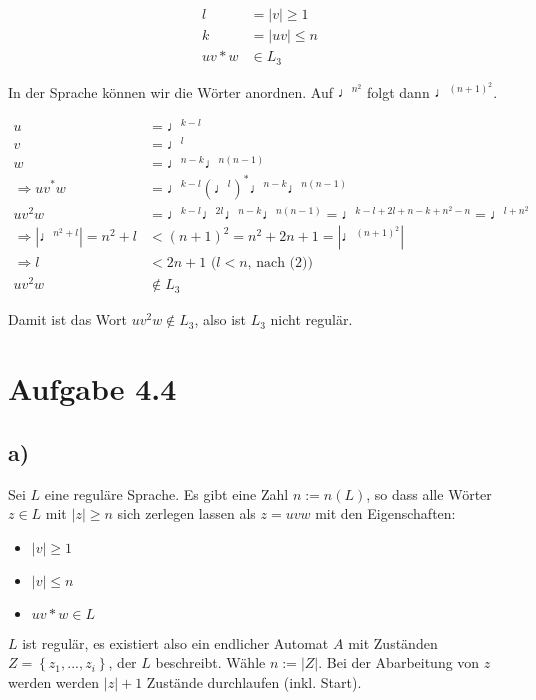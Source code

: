 \documentclass{article}
\begin{document}
\setcounter{equation}{0}
\begin{align}
l &= |v|  \geq 1 \\
k &= |uv| \leq n \\
uv*w &\in L_3
\end{align}

In der Sprache können wir die Wörter anordnen. Auf $\quarternote^{n^2}$ folgt dann $\quarternote^{(n+1)^2}$. 

\begin{align*}
u &= \quarternote^{k-l} \\
v &= \quarternote^{l} \\
w &= \quarternote^{n-k}\quarternote^{n(n-1)} \\
\Rightarrow uv^*w &= \quarternote^{k-l}\left(\quarternote^l\right)^*\quarternote^{n-k}\quarternote^{n(n-1)} \\
uv^2w &= \quarternote^{k-l}\quarternote^{2l}\quarternote^{n-k}\quarternote^{n(n-1)} = \quarternote^{k-l+2l+n-k+n^2-n} = \quarternote^{l+n^2} \\
\Rightarrow |\quarternote^{n^2+l}| = n^2+l &< (n+1)^2 = n^2+2n+1= |\quarternote^{(n+1)^2}| \\
\Rightarrow l &< 2n+1 \mbox{ ($l < n$, nach (2))} \\
uv^2w &\notin L_3
\end{align*}

Damit ist das Wort $uv^2w \notin L_3$, also ist $L_3$ nicht regulär.


\section*{Aufgabe 4.4}
\subsection*{a)}
Sei $L$ eine reguläre Sprache. Es gibt eine Zahl $n := n(L)$, so dass alle Wörter $z \in L$ mit $|z| \geq n$ sich zerlegen lassen als $z = uvw$ mit den Eigenschaften:
\begin{itemize}
	\item $|v| \geq 1$
	\item $|v| \leq n$
	\item $uv*w \in L$
\end{itemize}

$L$ ist regulär, es existiert also ein endlicher Automat $A$ mit Zuständen \linebreak$Z = \left\{z_1, ..., z_i\right\}$, der $L$ beschreibt. Wähle $n := |Z|$. Bei der Abarbeitung von $z$ werden werden $|z|+1$ Zustände durchlaufen (inkl. Start).
\end{document}

